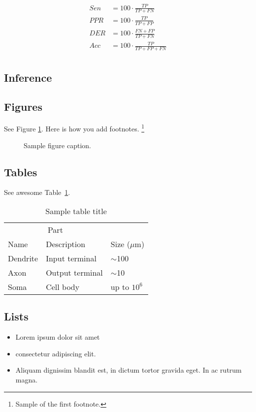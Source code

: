 \documentclass{article}
\begin{document}
\begin{align}
   Sen &= 100 \cdot \frac{TP}{TP+FN}\\
   PPR &= 100 \cdot \frac{TP}{TP+FP}\\
   DER &= 100 \cdot \frac{FN+FP}{TP+FN}\\
   Acc &= 100 \cdot \frac{TP}{TP+FP+FN}\\
\end{align}
\subsection{Inference}



\subsection{Figures}
\lipsum[10] 
See Figure \ref{fig:fig1}. Here is how you add footnotes. \footnote{Sample of the first footnote.}
\lipsum[11] 

\begin{figure}
  \centering
  \fbox{\rule[-.5cm]{4cm}{4cm} \rule[-.5cm]{4cm}{0cm}}
  \caption{Sample figure caption.}
  \label{fig:fig1}
\end{figure}

\subsection{Tables}
\lipsum[12]
See awesome Table~\ref{tab:table}.

\begin{table}
 \caption{Sample table title}
  \centering
  \begin{tabular}{lll}
    \toprule
    \multicolumn{2}{c}{Part}                   \\
    \cmidrule(r){1-2}
    Name     & Description     & Size ($\mu$m) \\
    \midrule
    Dendrite & Input terminal  & $\sim$100     \\
    Axon     & Output terminal & $\sim$10      \\
    Soma     & Cell body       & up to $10^6$  \\
    \bottomrule
  \end{tabular}
  \label{tab:table}
\end{table}

\subsection{Lists}
\begin{itemize}
\item Lorem ipsum dolor sit amet
\item consectetur adipiscing elit. 
\item Aliquam dignissim blandit est, in dictum tortor gravida eget. In ac rutrum magna.
\end{itemize}





\end{document}
